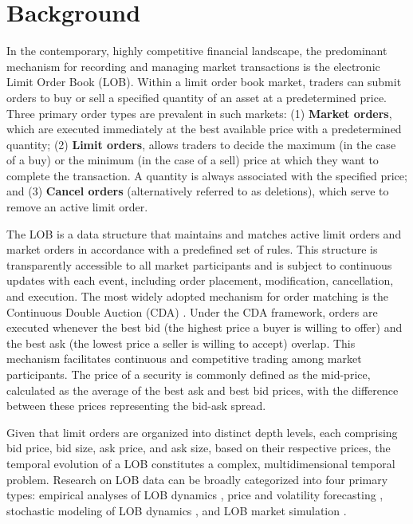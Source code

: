\section{Background}
In the contemporary, highly competitive financial landscape, the predominant mechanism for recording and managing market transactions is the electronic Limit Order Book (LOB). Within a limit order book market, traders can submit orders to buy or sell a specified quantity of an asset at a predetermined price. Three primary order types are prevalent in such markets: (1) \textbf{Market orders}, which are executed immediately at the best available price with a predetermined quantity; (2) \textbf{Limit orders}, allows traders to decide the maximum (in the case of a buy) or the minimum (in the case of a sell) price at which they want to complete the transaction. A quantity is always associated  with the specified price; and (3) \textbf{Cancel orders} (alternatively referred to as deletions), which serve to remove an active limit order.

The LOB is a data structure that maintains and matches active limit orders and market orders in accordance with a predefined set of rules. This structure is transparently accessible to all market participants and is subject to continuous updates with each event, including order placement, modification, cancellation, and execution. The most widely adopted mechanism for order matching is the Continuous Double Auction (CDA) \cite{bouchaud2018trades}. Under the CDA framework, orders are executed whenever the best bid (the highest price a buyer is willing to offer) and the best ask (the lowest price a seller is willing to accept) overlap. This mechanism facilitates continuous and competitive trading among market participants. The price of a security is commonly defined as the mid-price, calculated as the average of the best ask and best bid prices, with the difference between these prices representing the bid-ask spread.

Given that limit orders are organized into distinct depth levels, each comprising bid price, bid size, ask price, and ask size, based on their respective prices, the temporal evolution of a LOB constitutes a complex, multidimensional temporal problem. Research on LOB data can be broadly categorized into four primary types: empirical analyses of LOB dynamics \cite{cont2001empirical, bouchaud2002statistical}, price and volatility forecasting \cite{zhang2019deeplob, sirignano2019deep}, stochastic modeling of LOB dynamics \cite{cont2011statistical, gould2013limit}, and LOB market simulation \cite{byrd2020abides, coletta2021towards, li2020generating}.

